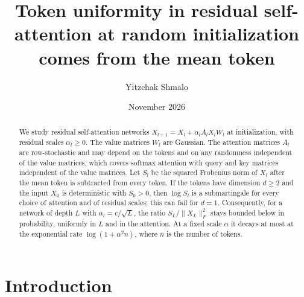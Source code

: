 \documentclass[11pt]{amsart}
\title[Token uniformity in residual self-attention]{Token uniformity in residual self-attention at random initialization comes from the mean token}
\author{Yitzchak Shmalo}
\date{November 2026}
\theoremstyle{definition}
\theoremstyle{remark}
\numberwithin{equation}{section}
\begin{document}
\begin{abstract}
We study residual self-attention networks $X_{l+1}=X_l+\alpha_lA_lX_lW_l$ at initialization, with residual scales $\alpha_l\ge0$. The value matrices $W_l$ are Gaussian. The attention matrices $A_l$ are row-stochastic and may depend on the tokens and on any randomness independent of the value matrices, which covers softmax attention with query and key matrices independent of the value matrices. Let $S_l$ be the squared Frobenius norm of $X_l$ after the mean token is subtracted from every token. If the tokens have dimension $d\ge2$ and the input $X_0$ is deterministic with $S_0>0$, then $\log S_l$ is a submartingale for every choice of attention and of residual scales; this can fail for $d=1$. Consequently, for a network of depth $L$ with $\alpha_l=c/\sqrt L$, the ratio $S_L/\|X_L\|_F^2$ stays bounded below in probability, uniformly in $L$ and in the attention. At a fixed scale $\alpha$ it decays at most at the exponential rate $\log(1+\alpha^2n)$, where $n$ is the number of tokens.
\end{abstract}


\maketitle

\section{Introduction}\label{sec:intro}
\end{document}
